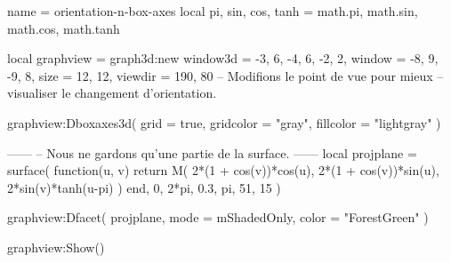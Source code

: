 \documentclass{standalone}
\begin{document}
\begin{luadraw}{name = orientation-n-box-axes}
local pi, sin, cos, tanh = math.pi, math.sin, math.cos, math.tanh

local graphview = graph3d:new{
  window3d = {-3, 6, -4, 6, -2, 2},
  window   = {-8, 9, -9, 8},
  size     = {12, 12},
  viewdir  = {190, 80}  -- Modifions le point de vue pour mieux
                        -- visualiser le changement d'orientation.
}

graphview:Dboxaxes3d({
  grid      = true,
  gridcolor = "gray",
  fillcolor = "lightgray"
})

------
-- Nous ne gardons qu'une partie de la surface.
------
local projplane = surface(
  function(u, v)
    return M(
      2*(1 + cos(v))*cos(u),
      2*(1 + cos(v))*sin(u),
      2*sin(v)*tanh(u-pi)
    )
  end,
  0, 2*pi, 0.3, pi,
  {51, 15}
)

graphview:Dfacet(
  projplane,
  {
    mode  = mShadedOnly,
    color = "ForestGreen"
  }
)

graphview:Show()
\end{luadraw}
\end{document}
